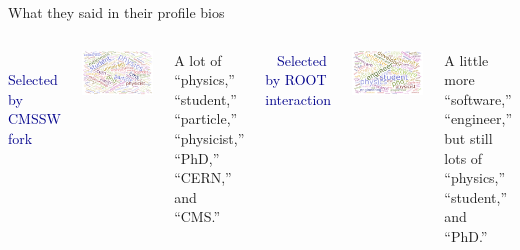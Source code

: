 \documentclass[aspectratio=169]{beamer}
\begin{document}
\begin{frame}{What they said in their profile bios}
\vspace{0.5 cm}
\begin{columns}
\mbox{ } \hfill \textcolor{darkblue}{\large Selected by CMSSW fork} \hfill \mbox{ }

\vspace{0.2 cm}
\includegraphics[width=\linewidth]{PLOTS/cmssw-profile-bios-wordcloud.pdf}

\begin{center}
\begin{minipage}{0.9\linewidth}
A lot of ``physics,'' ``student,'' ``particle,'' ``physicist,'' ``PhD,'' ``CERN,'' and ``CMS.''
\end{minipage}
\end{center}

\mbox{ } \hfill \textcolor{darkblue}{\large Selected by ROOT interaction} \hfill \mbox{ }

\vspace{0.2 cm}
\includegraphics[width=\linewidth]{PLOTS/root-repo-profile-bios-wordcloud.pdf}

\begin{center}
\begin{minipage}{0.95\linewidth}
A little more ``software,'' ``engineer,'' but still lots of ``physics,'' ``student,'' and ``PhD.''
\end{minipage}
\end{center}

\end{columns}
\end{frame}
\end{document}
